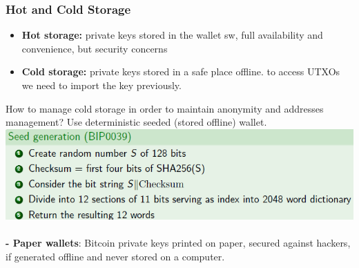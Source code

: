 \documentclass{article}
\begin{document}
\subsubsection{Hot and Cold Storage}
\begin{itemize}
\item \textbf{Hot storage: }private keys stored in the wallet sw, full availability and convenience, but security concerns
\item \textbf{Cold storage: }private keys stored in a safe place offline. to access UTXOs we need to import the key previously.
\end{itemize}
How to manage cold storage in order to maintain anonymity and addresses management? Use deterministic seeded (stored offline) wallet. \\
\includegraphics[scale=0.6]{38.png}\\\\
\textbf{- Paper wallets}: Bitcoin private keys printed on paper, secured against hackers, if generated offline and never stored on a computer.\\
\end{document}
